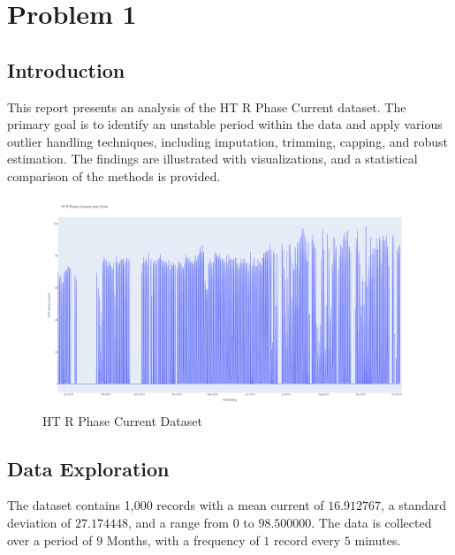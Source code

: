 \section{Problem 1}

\subsection{Introduction}

This report presents an analysis of the HT R Phase Current dataset. The primary goal is to identify an unstable period within the data and apply various outlier handling techniques, including imputation, trimming, capping, and robust estimation. The findings are illustrated with visualizations, and a statistical comparison of the methods is provided.

\begin{figure}[H]
	\centering
	\includegraphics[width=\textwidth]{./Images/ht_r_phase_current.png}
	\caption{HT R Phase Current Dataset}
\end{figure}

\clearpage

\subsection{Data Exploration}

The dataset contains 1,000 records with a mean current of $16.912767$, a standard deviation of $27.174448$, and a range from $0$ to $98.500000$. The data is collected over a period of $9$ Months, with a frequency of $1$ record every $5$ minutes.


